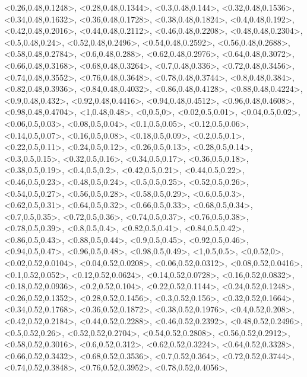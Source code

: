 \documentclass[a4paper,10pt]{article}
\begin{document}
\begin{eulernotebook}
\begin{euleroutput}
  <0.26,0.48,0.1248>,
  <0.28,0.48,0.1344>,
  <0.3,0.48,0.144>,
  <0.32,0.48,0.1536>,
  <0.34,0.48,0.1632>,
  <0.36,0.48,0.1728>,
  <0.38,0.48,0.1824>,
  <0.4,0.48,0.192>,
  <0.42,0.48,0.2016>,
  <0.44,0.48,0.2112>,
  <0.46,0.48,0.2208>,
  <0.48,0.48,0.2304>,
  <0.5,0.48,0.24>,
  <0.52,0.48,0.2496>,
  <0.54,0.48,0.2592>,
  <0.56,0.48,0.2688>,
  <0.58,0.48,0.2784>,
  <0.6,0.48,0.288>,
  <0.62,0.48,0.2976>,
  <0.64,0.48,0.3072>,
  <0.66,0.48,0.3168>,
  <0.68,0.48,0.3264>,
  <0.7,0.48,0.336>,
  <0.72,0.48,0.3456>,
  <0.74,0.48,0.3552>,
  <0.76,0.48,0.3648>,
  <0.78,0.48,0.3744>,
  <0.8,0.48,0.384>,
  <0.82,0.48,0.3936>,
  <0.84,0.48,0.4032>,
  <0.86,0.48,0.4128>,
  <0.88,0.48,0.4224>,
  <0.9,0.48,0.432>,
  <0.92,0.48,0.4416>,
  <0.94,0.48,0.4512>,
  <0.96,0.48,0.4608>,
  <0.98,0.48,0.4704>,
  <1,0.48,0.48>,
  <0,0.5,0>,
  <0.02,0.5,0.01>,
  <0.04,0.5,0.02>,
  <0.06,0.5,0.03>,
  <0.08,0.5,0.04>,
  <0.1,0.5,0.05>,
  <0.12,0.5,0.06>,
  <0.14,0.5,0.07>,
  <0.16,0.5,0.08>,
  <0.18,0.5,0.09>,
  <0.2,0.5,0.1>,
  <0.22,0.5,0.11>,
  <0.24,0.5,0.12>,
  <0.26,0.5,0.13>,
  <0.28,0.5,0.14>,
  <0.3,0.5,0.15>,
  <0.32,0.5,0.16>,
  <0.34,0.5,0.17>,
  <0.36,0.5,0.18>,
  <0.38,0.5,0.19>,
  <0.4,0.5,0.2>,
  <0.42,0.5,0.21>,
  <0.44,0.5,0.22>,
  <0.46,0.5,0.23>,
  <0.48,0.5,0.24>,
  <0.5,0.5,0.25>,
  <0.52,0.5,0.26>,
  <0.54,0.5,0.27>,
  <0.56,0.5,0.28>,
  <0.58,0.5,0.29>,
  <0.6,0.5,0.3>,
  <0.62,0.5,0.31>,
  <0.64,0.5,0.32>,
  <0.66,0.5,0.33>,
  <0.68,0.5,0.34>,
  <0.7,0.5,0.35>,
  <0.72,0.5,0.36>,
  <0.74,0.5,0.37>,
  <0.76,0.5,0.38>,
  <0.78,0.5,0.39>,
  <0.8,0.5,0.4>,
  <0.82,0.5,0.41>,
  <0.84,0.5,0.42>,
  <0.86,0.5,0.43>,
  <0.88,0.5,0.44>,
  <0.9,0.5,0.45>,
  <0.92,0.5,0.46>,
  <0.94,0.5,0.47>,
  <0.96,0.5,0.48>,
  <0.98,0.5,0.49>,
  <1,0.5,0.5>,
  <0,0.52,0>,
  <0.02,0.52,0.0104>,
  <0.04,0.52,0.0208>,
  <0.06,0.52,0.0312>,
  <0.08,0.52,0.0416>,
  <0.1,0.52,0.052>,
  <0.12,0.52,0.0624>,
  <0.14,0.52,0.0728>,
  <0.16,0.52,0.0832>,
  <0.18,0.52,0.0936>,
  <0.2,0.52,0.104>,
  <0.22,0.52,0.1144>,
  <0.24,0.52,0.1248>,
  <0.26,0.52,0.1352>,
  <0.28,0.52,0.1456>,
  <0.3,0.52,0.156>,
  <0.32,0.52,0.1664>,
  <0.34,0.52,0.1768>,
  <0.36,0.52,0.1872>,
  <0.38,0.52,0.1976>,
  <0.4,0.52,0.208>,
  <0.42,0.52,0.2184>,
  <0.44,0.52,0.2288>,
  <0.46,0.52,0.2392>,
  <0.48,0.52,0.2496>,
  <0.5,0.52,0.26>,
  <0.52,0.52,0.2704>,
  <0.54,0.52,0.2808>,
  <0.56,0.52,0.2912>,
  <0.58,0.52,0.3016>,
  <0.6,0.52,0.312>,
  <0.62,0.52,0.3224>,
  <0.64,0.52,0.3328>,
  <0.66,0.52,0.3432>,
  <0.68,0.52,0.3536>,
  <0.7,0.52,0.364>,
  <0.72,0.52,0.3744>,
  <0.74,0.52,0.3848>,
  <0.76,0.52,0.3952>,
  <0.78,0.52,0.4056>,

\end{euleroutput}
\end{eulernotebook}
\end{document}
